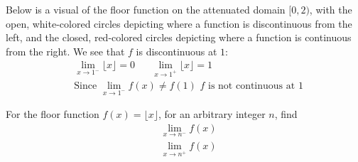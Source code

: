 \begin{example}
Below is a visual of the floor function on the attenuated domain $[0, 2)$, with the open, white-colored circles depicting where a function is discontinuous from the left, and the closed, red-colored circles depicting where a function is continuous from the right. We see that $f$ is discontinuous at $1$:
\begin{align*}
    &\lim_{x \longrightarrow 1^{-}} \lfloor x \rfloor = 0 \hspace{20pt} \lim_{x \longrightarrow 1^{+}} \lfloor x \rfloor = 1\\[2ex]
    &\text{Since} \hspace{4pt} \lim_{x \longrightarrow 1^{-}} f(x) \neq f(1) \hspace{4pt} f \hspace{4pt} \text{is not continuous at} \hspace{4pt} 1
\end{align*}

\resizebox{30em}{30em}{%
\begin{tikzpicture}[scale=\textwidth/4.2cm]
    \node at (1.3, 1.5) {$f(x)=\lfloor x \rfloor, \hspace{4pt} x \in [0, 2)$};
    \draw (0, 0) -- (2, 0)
        node[right] {$x$};
    \draw (0, 0) -- (0, 1.3)
        node[above] {$f(x)$};
    \draw[blue, very thick] plot[smooth] file {limits_of_functions/python_generated_tables/floor_0_2_piece_0.table};
    \draw[blue, very thick] plot[smooth] file {limits_of_functions/python_generated_tables/floor_0_2_piece_1.table};
    \draw[blue, fill=white] (1,0) circle (.25mm);
    \draw[blue, fill=white] (2,1) circle (.25mm);
    \draw[blue, fill=red] (0,0) circle (.25mm);
    \draw[blue, fill=red] (1,1) circle (.25mm);
    \node at (0, -0.1) {0};
    \node at (1, -0.1) {1};
    \node at (2, -0.1) {2};
\end{tikzpicture}
}
\end{example}

\begin{exercise}
For the floor function $f(x) = \lfloor x \rfloor$, for an arbitrary integer $n$, find
\begin{align*}
    &\lim_{x \longrightarrow n^{-}} f(x)\\
    &\lim_{x \longrightarrow n^{+}} f(x)
\end{align*}
\end{exercise}

